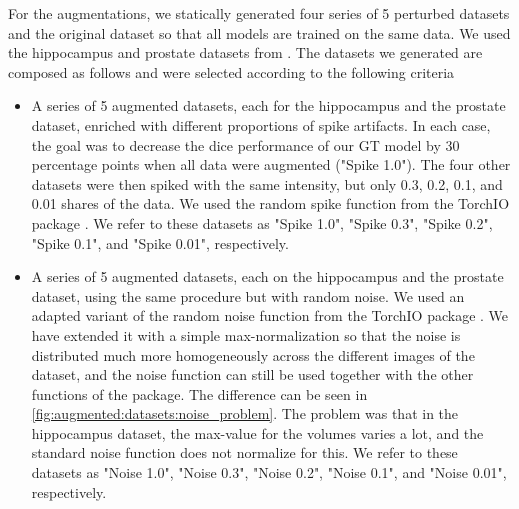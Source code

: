 For the augmentations, we statically generated four series of 5 perturbed datasets and the original dataset so that all models are trained on the same data. We used the hippocampus and prostate datasets from \autocite{Antonelli:2022:MedSegmentationDecatlon}. The datasets we generated are composed as follows and were selected according to the following criteria \begin{itemize}
    \item A series of 5 augmented datasets, each for the hippocampus and the prostate dataset, enriched with different proportions of spike artifacts.
    In each case, the goal was to decrease the dice performance of our GT model by 30 percentage points when all data were augmented ("Spike 1.0"). The four other datasets were then spiked with the same intensity, but only 0.3, 0.2, 0.1, and 0.01 shares of the data. We used the random spike function from the TorchIO package \autocite{torchIO}.
    We refer to these datasets as "Spike 1.0", "Spike 0.3", "Spike 0.2", "Spike 0.1", and "Spike 0.01", respectively. 
    \item A series of 5 augmented datasets, each on the hippocampus and the prostate dataset, using the same procedure but with random noise. We used an adapted variant of the random noise function from the TorchIO package \autocite{torchIO}. We have extended it with a simple max-normalization so that the noise is distributed much more homogeneously across the different images of the dataset, and the noise function can still be used together with the other functions of the package. The difference can be seen in \autoref{fig:augmented:datasets:noise_problem}. The problem was that in the hippocampus dataset, the max-value for the volumes varies a lot, and the standard noise function does not normalize for this.
    We refer to these datasets as "Noise 1.0", "Noise 0.3", "Noise 0.2", "Noise 0.1", and "Noise 0.01", respectively.
\end{itemize}

